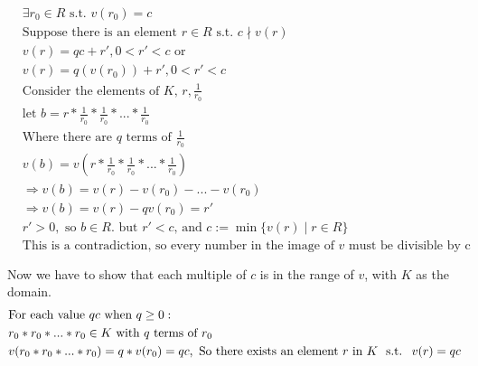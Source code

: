 \documentclass[11pt]{article}
\newcommand{\st}{
	\text{ s.t. }
}
\begin{document}
{  \begin{align*}
     & \exists r_0 \in R \st v(r_0) = c                                                           \\
     & \text{Suppose there is an element $r \in R \st c \nmid v(r)$}                              \\
     & v(r) = qc + r', 0 < r' < c \text{ or}                                                      \\
     & v(r) = q(v(r_0)) + r', 0 < r' < c                                                          \\
     & \text{Consider the elements of $K$, $r, \frac{1}{r_0}$}                                    \\
     & \text{let } b = r * \frac{1}{r_0} * \frac{1}{r_0} * ... * \frac{1}{r_0}                    \\
     & \text{Where there are $q$ terms of $\frac{1}{r_0}$}                                        \\
     & v(b) = v(r * \frac{1}{r_0} * \frac{1}{r_0} * ... * \frac{1}{r_0})                          \\
     & \Rightarrow v(b) = v(r) - v(r_0) - ... - v(r_0)                                            \\
     & \Rightarrow v(b) = v(r) - qv(r_0) = r'                                                     \\
     & r' > 0, \text{ so } b \in R. \text{ but $r' < c$, and $c := \min \{v(r) \mid r \in R$\}}   \\
     & \text{This is a contradiction, so every number in the image of $v$ must be divisible by c} \\
     &                                                                                            \\
  \end{align*}
  Now we have to show that each multiple of $c$ is in the range of $v$, with $K$ as the domain.
  \begin{align*}
     & \text{For each value $qc$ when $q \geq 0$}:                                                                                    \\
     & r_0*r_0*...*r_0 \in K \text{ with $q$ terms of $r_0$}                                                                          \\
     & v(r_0*r_0*...*r_0) = q*v(r_0) = qc, \text{ So there exists an element $r$ in $K$ \st $v(r) = qc$}                              \\

\end{align*}}
\end{document}
